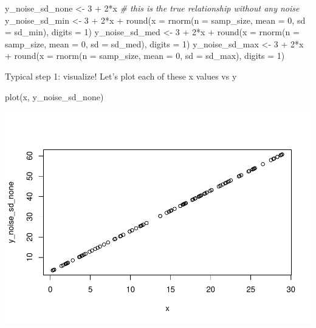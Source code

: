\documentclass[
]{book}
\newenvironment{Shaded}{\begin{snugshade}}{\end{snugshade}}
\newcommand{\AttributeTok}[1]{\textcolor[rgb]{0.77,0.63,0.00}{#1}}
\newcommand{\CommentTok}[1]{\textcolor[rgb]{0.56,0.35,0.01}{\textit{#1}}}
\newcommand{\DecValTok}[1]{\textcolor[rgb]{0.00,0.00,0.81}{#1}}
\newcommand{\FunctionTok}[1]{\textcolor[rgb]{0.00,0.00,0.00}{#1}}
\newcommand{\NormalTok}[1]{#1}
\newcommand{\OtherTok}[1]{\textcolor[rgb]{0.56,0.35,0.01}{#1}}
\newcommand{\SpecialCharTok}[1]{\textcolor[rgb]{0.00,0.00,0.00}{#1}}
\begin{document}
\begin{Shaded}
\begin{Highlighting}[]
\NormalTok{y\_noise\_sd\_none }\OtherTok{\textless{}{-}} \DecValTok{3} \SpecialCharTok{+} \DecValTok{2}\SpecialCharTok{*}\NormalTok{x }\CommentTok{\# this is the true relationship without any noise}
\NormalTok{y\_noise\_sd\_min }\OtherTok{\textless{}{-}} \DecValTok{3} \SpecialCharTok{+} \DecValTok{2}\SpecialCharTok{*}\NormalTok{x }\SpecialCharTok{+} \FunctionTok{round}\NormalTok{(}\AttributeTok{x =} \FunctionTok{rnorm}\NormalTok{(}\AttributeTok{n =}\NormalTok{ samp\_size, }\AttributeTok{mean =} \DecValTok{0}\NormalTok{, }\AttributeTok{sd =}\NormalTok{ sd\_min), }\AttributeTok{digits =} \DecValTok{1}\NormalTok{)}
\NormalTok{y\_noise\_sd\_med }\OtherTok{\textless{}{-}} \DecValTok{3} \SpecialCharTok{+} \DecValTok{2}\SpecialCharTok{*}\NormalTok{x }\SpecialCharTok{+} \FunctionTok{round}\NormalTok{(}\AttributeTok{x =} \FunctionTok{rnorm}\NormalTok{(}\AttributeTok{n =}\NormalTok{ samp\_size, }\AttributeTok{mean =} \DecValTok{0}\NormalTok{, }\AttributeTok{sd =}\NormalTok{ sd\_med), }\AttributeTok{digits =} \DecValTok{1}\NormalTok{)}
\NormalTok{y\_noise\_sd\_max }\OtherTok{\textless{}{-}} \DecValTok{3} \SpecialCharTok{+} \DecValTok{2}\SpecialCharTok{*}\NormalTok{x }\SpecialCharTok{+} \FunctionTok{round}\NormalTok{(}\AttributeTok{x =} \FunctionTok{rnorm}\NormalTok{(}\AttributeTok{n =}\NormalTok{ samp\_size, }\AttributeTok{mean =} \DecValTok{0}\NormalTok{, }\AttributeTok{sd =}\NormalTok{ sd\_max), }\AttributeTok{digits =} \DecValTok{1}\NormalTok{)}
\end{Highlighting}
\end{Shaded}

Typical step 1: visualize! Let's plot each of these x values vs y

\begin{Shaded}
\begin{Highlighting}[]
\FunctionTok{plot}\NormalTok{(x, y\_noise\_sd\_none)}
\end{Highlighting}
\end{Shaded}

\includegraphics{test_course_notes_files/figure-latex/remedy006-1.pdf}
\end{document}
